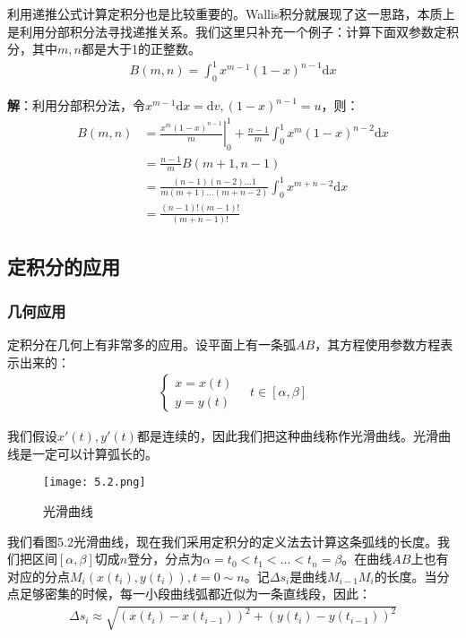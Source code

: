 \documentclass{ctexart}
\let\oldtextbf\textbf %
\renewcommand{\textbf}[1]{\textcolor{btex}{\oldtextbf{#1}}} %
\begin{document}
利用递推公式计算定积分也是比较重要的。Wallis积分就展现了这一思路，本质上是利用分部积分法寻找递推关系。我们这里只补充一个例子：计算下面双参数定积分，其中$m,n$都是大于1的正整数。
\begin{align*}
    B(m,n)=\int_0^1 x^{m-1}(1-x)^{n-1}\mathrm{d}x
\end{align*}

\textbf{解}：利用分部积分法，令$x^{m-1}\mathrm{d}x=\mathrm{d}v,(1-x)^{n-1}=u$，则：
\begin{align*}
B(m,n)&=\left.\frac{x^m(1-x)^{n-1}}{m}\right|_0^1+\frac{n-1}{m}\int_0^1x^m(1-x)^{n-2}\mathrm{d}x\\
&=  \frac{n-1}{m}B(m+1,n-1)\\
&=\frac{(n-1)(n-2)...1}{m(m+1)...(m+n-2)} \int_0^1x^{m+n-2}\mathrm{d}x\\
&=\frac{(n-1)!(m-1)!}{(m+n-1)!} 
\end{align*}

\subsection{定积分的应用}
\subsubsection{几何应用}
定积分在几何上有非常多的应用。设平面上有一条弧$AB$，其方程使用参数方程表示出来的：
\begin{align*}
    \begin{cases}
        x=x(t)\\
        y=y(t)
    \end{cases}\quad t\in[\alpha,\beta]
\end{align*}

我们假设$x'(t),y'(t)$都是连续的，因此我们把这种曲线称作光滑曲线。光滑曲线是一定可以计算弧长的。
\begin{figure}[H]    
\centering     
\renewcommand{\figurename}{图}     
\renewcommand{\thefigure}{5.2}    
\begin{myimagebox}[width=0.25\textwidth] %
\texttt{[image: 5.2.png]} %
\end{myimagebox}     
\caption{\label{fig:5.2}光滑曲线}   
\end{figure}

我们看图5.2光滑曲线，现在我们采用定积分的定义法去计算这条弧线的长度。我们把区间$[\alpha,\beta]$切成$n$登分，分点为$\alpha=t_0<t_1<...<t_n=\beta$。在曲线$AB$上也有对应的分点$M_i(x(t_i),y(t_i)),t=0\sim n$。记$\Delta s_i$是曲线$M_{i-1}M_{i}$的长度。当分点足够密集的时候，每一小段曲线弧都近似为一条直线段，因此：
\begin{align*}
    \Delta s_i\approx \sqrt{(x(t_i)-x(t_{i-1}))^2+(y(t_i)-y(t_{i-1}))^2}
\end{align*}
\end{document}
